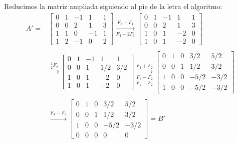 \documentclass[handout]{beamer} %
\renewcommand{\_}[1]{_{\left[ #1 \right]}}
\renewcommand{\^}[1]{^{\left[ #1 \right]}}
\begin{document}
\begin{frame}

Reducimos la matriz ampliada siguiendo al pie de la letra el algoritmo:\pause
{\footnotesize
    \begin{align*}
    A'=&
    \left[
    \begin{array}{rrrr|r}
    0& 1 & -1 & 1 & 1 \\
    0&0& 2& 1 & 3 \\
    1&1& 0&-1 & 1 \\
    1&2& -1& 0 & 2
    \end{array}
    \right]
        \underset{F_4-2F_1}{\stackrel{F_3- F_1}{\longrightarrow}}
    \left[
    \begin{array}{rrrr|r}
    0& 1 & -1 & 1 & 1 \\
    0&0& 2& 1 & 3 \\
    1&0& 1&-2 & 0 \\
    1&0& 1& -2 & 0
    \end{array}
    \right]
    \\
    &
    \\
    &    \overset{\frac{1}{2}F_2}{\longrightarrow}
    \left[
    \begin{array}{rrrr|r}
    0& 1 & -1 & 1 & 1 \\
    0&0& 1& {1}/{2} & {3}/{2} \\
    1&0& 1&-2 & 0 \\
    1&0& 1& -2 & 0
    \end{array}
    \right]
        \underset{F_4-F_2}{\underset{F_3-F_2}{\stackrel{F_1+ F_2}{\longrightarrow}}}
    \left[
    \begin{array}{rrrr|r}
    0& 1 & 0 & {3}/{2} &{5}/{2} \\
    0&0& 1& {1}/{2} & {3}/{2} \\
    1&0& 0&-{5}/{2} & -{3}/{2} \\
    1&0& 0& -{5}/{2} & -{3}/{2}
    \end{array}
    \right]    \\
    &    
    \\
    &    \overset{F_4-F_3}{\longrightarrow}
    \left[
    \begin{array}{rrrr|r}
    0& 1 & 0 & {3}/{2} &{5}/{2} \\
    0&0& 1& {1}/{2} & {3}/{2} \\
    1&0& 0&-{5}/{2} & -{3}/{2} \\
    0&0& 0&0 & 0
    \end{array}
    \right] =B'
    \end{align*}
} 
\end{frame}
\end{document}
